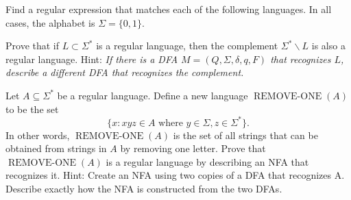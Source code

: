 \documentclass[12pt]{exam}
\begin{document}
\begin{questions}
\vfill


\newpage
\question Find a regular expression that matches each of the following languages. In all cases, the alphabet is $\Sigma = \{0,1\}$.  



\question Prove that if $L \subset \Sigma^*$ is a regular language, then the complement $\Sigma^* \backslash L$ is also a regular language. Hint: \textit{If there is a DFA $M = (Q, \Sigma, \delta, q, F)$ that recognizes $L$, describe a different DFA that recognizes the complement.}  
\vfill

\question Let $A \subseteq \Sigma^*$ be a regular language.  Define a new language $\operatorname{REMOVE-ONE}(A)$ to be the set 
$$\{x : xyz \in A \text{ where } y \in \Sigma, z \in \Sigma^*\}.$$
In other words, $\operatorname{REMOVE-ONE}(A)$ is the set of all strings that can be obtained from strings in $A$ by removing one letter.
Prove that $\operatorname{REMOVE-ONE}(A)$ is a regular language by describing an NFA that recognizes it. Hint: Create an NFA using two copies of a DFA that recognizes A.  Describe exactly how the NFA is constructed from the two DFAs.  
\vfill


\end{questions}
\end{document}
